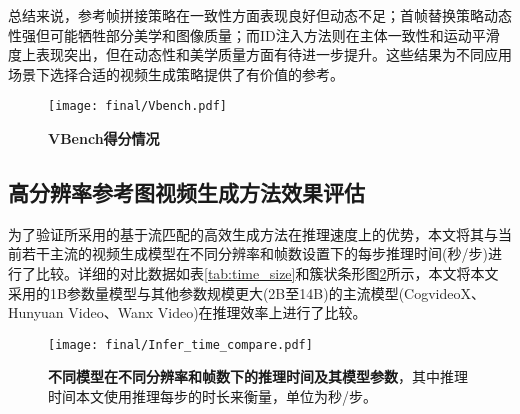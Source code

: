 总结来说，参考帧拼接策略在一致性方面表现良好但动态不足；首帧替换策略动态性强但可能牺牲部分美学和图像质量；而ID注入方法则在主体一致性和运动平滑度上表现突出，但在动态性和美学质量方面有待进一步提升。这些结果为不同应用场景下选择合适的视频生成策略提供了有价值的参考。


\begin{figure}[htbp]
    \centering
    \texttt{[image: final/Vbench.pdf]}
    \caption{\textbf{VBench得分情况}}
    \label{fig:vbench}
\end{figure}

\subsection{高分辨率参考图视频生成方法效果评估} %
为了验证所采用的基于流匹配的高效生成方法在推理速度上的优势，本文将其与当前若干主流的视频生成模型在不同分辨率和帧数设置下的每步推理时间(秒/步)进行了比较。详细的对比数据如表\ref{tab:time_size}和簇状条形图\ref{fig:time_size}所示，本文将本文采用的1B参数量模型与其他参数规模更大(2B至14B)的主流模型(CogvideoX、Hunyuan Video、Wanx Video)在推理效率上进行了比较。
\begin{table}[htbp]
    \centering
    \caption{不同模型参数量及在不同分辨率和帧数下的推理时间(秒/步)对比}
    \label{tab:time_size}
\end{table}
\begin{figure}[htbp]
    \centering
    \texttt{[image: final/Infer\_time\_compare.pdf]}
    \caption{\textbf{不同模型在不同分辨率和帧数下的推理时间及其模型参数}，其中推理时间本文使用推理每步的时长来衡量，单位为秒/步。
    }
    \label{fig:time_size}
\end{figure}

